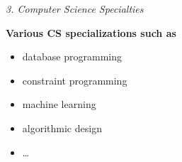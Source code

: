 \documentclass[
        english,biblatex
    ]{lni}
\providecommand{\tightlist}{%
    \setlength{\itemsep}{0pt}\setlength{\parskip}{0pt}}
\begin{document}
    \emph{3. Computer Science Specialties}

    \textbf{Various CS specializations such as}

    \begin{itemize}
    \tightlist
    \item
      database programming
    \item
      constraint programming
    \item
      machine learning
    \item
      algorithmic design
    \item
      \ldots{}
    \end{itemize}

\end{document}
